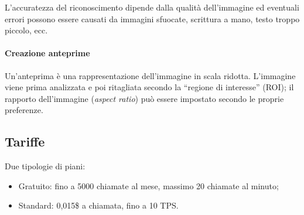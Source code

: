 L'accuratezza del riconoscimento dipende dalla qualità dell'immagine ed eventuali errori possono essere causati da immagini sfuocate, scrittura a mano, testo troppo piccolo, ecc.
   
\paragraph{Creazione anteprime} Un'anteprima è una rappresentazione dell'immagine in scala ridotta. L'immagine viene prima analizzata e poi ritagliata secondo la ``regione di interesse'' (ROI); il rapporto dell'immagine (\textit{aspect ratio}) può essere impostato secondo le proprie preferenze.

\subsection{Tariffe} Due tipologie di piani:
\begin{itemize}
\item Gratuito: fino a 5000 chiamate al mese, massimo 20 chiamate al minuto;
\item Standard: 0,015\$ a chiamata, fino a 10 TPS.
\end{itemize}
